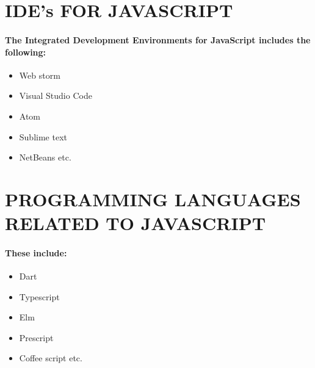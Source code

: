 \documentclass{article}
\begin{document}
	\section*{IDE’s FOR JAVASCRIPT}
	\paragraph{The Integrated Development Environments for JavaScript includes the following:}
	\begin{itemize}
		\item Web storm
		\item Visual Studio Code
		\item Atom
		\item Sublime text
		\item NetBeans etc.
\end{itemize}
\newpage
\section*{PROGRAMMING LANGUAGES RELATED TO JAVASCRIPT}
\paragraph{These include:
}
\begin{itemize}
	\item Dart
	\item Typescript
	\item Elm
	\item Prescript
	\item Coffee script etc.
\end{itemize}

	\newpage
	\pagecolor{white}
	\color{black}
\end{document}
